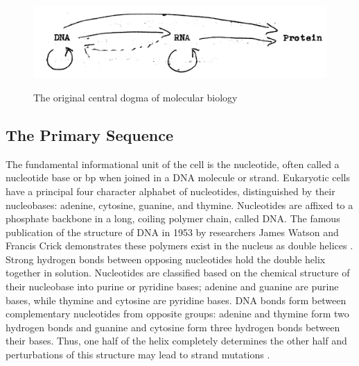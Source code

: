 \begin{figure}[b]
  \centering
  \caption{The original central dogma of molecular biology \citep{crick1970}}
  \includegraphics[width=\textwidth]{figures/biology/dogma}\label{fig:dogma}
\end{figure}

\subsection*{The Primary Sequence}

The fundamental informational unit of the cell is the \gls{nucleotide}, often called a nucleotide base or \gls{bp} when joined in a
\gls{DNA} molecule or strand.  Eukaryotic cells have a principal four character alphabet of nucleotides, distinguished by their \glspl{nucleobase}:
adenine, cytosine, guanine, and thymine.  Nucleotides are affixed to a phosphate backbone in a long, coiling polymer chain, called \gls{DNA}.  The
famous publication of the structure of \gls{DNA} in 1953 by researchers James Watson and Francis Crick demonstrates these polymers
exist in the nucleus as double helices \citep{watson1953}.  Strong hydrogen bonds between opposing nucleotides hold the double helix together
in solution.  Nucleotides are classified based on the chemical structure of their nucleobase into purine or pyridine bases; adenine and guanine are purine bases,
while thymine and cytosine are pyridine bases.  \gls{DNA} bonds form between complementary nucleotides from opposite groups: adenine and thymine form
two hydrogen bonds and guanine and cytosine form three hydrogen bonds between their bases.  Thus, one half of the helix completely
determines the other half and perturbations of this structure may lead to strand mutations \citep{alberts2002,cox2008}.

